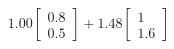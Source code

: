 \documentclass[preview]{standalone}
\begin{document}
\begin{align*}
1.00 \begin{bmatrix} 0.8 \\ 0.5 \end{bmatrix} + 1.48 \begin{bmatrix} 1 \\ 1.6 \end{bmatrix}
\end{align*}
\end{document}

